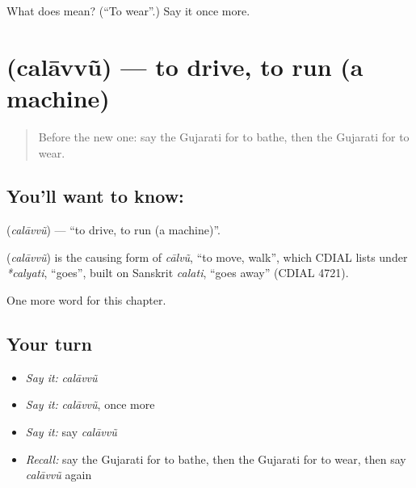 \begin{tcolorbox}[breakable,colback=teal!4,colframe=teal!35!black,title={Before you move on}]
What does  mean? (\textquotedblleft{}To wear\textquotedblright{}.) Say it once more.
\end{tcolorbox}
\section[\texorpdfstring{\gu{ચલાવવું} (calāvvũ)}{ચલાવવું (calāvvũ)}]{ (calāvvũ) — to drive, to run (a machine)}

\label{lesson:GU-C141-calavvu}



\begin{quote}
Before the new one: say the Gujarati for to bathe, then the Gujarati for to wear.
\end{quote}

\subsection*{You'll want to know: }
\textbf{} (\emph{calāvvũ}) — \textquotedblleft{}to drive, to run (a machine)\textquotedblright{}.

\begin{cousinweb}
\textbf{} (\emph{calāvvũ}) is the causing form of \emph{cālvũ}, \textquotedblleft{}to move, walk\textquotedblright{}, which CDIAL lists under \emph{*calyati}, \textquotedblleft{}goes\textquotedblright{}, built on Sanskrit \emph{calati}, \textquotedblleft{}goes away\textquotedblright{} (CDIAL 4721).
\end{cousinweb}

\begin{grammarlens}[title={What you've built}]
One more word for this chapter.
\end{grammarlens}

\subsection*{Your turn}
\begin{itemize}
\raggedright
  \item \emph{Say it:} \emph{calāvvũ}
  \item \emph{Say it:} \emph{calāvvũ}, once more
  \item \emph{Say it:} say \emph{calāvvũ}
  \item \emph{Recall:} say the Gujarati for to bathe, then the Gujarati for to wear, then say \emph{calāvvũ} again
\end{itemize}

